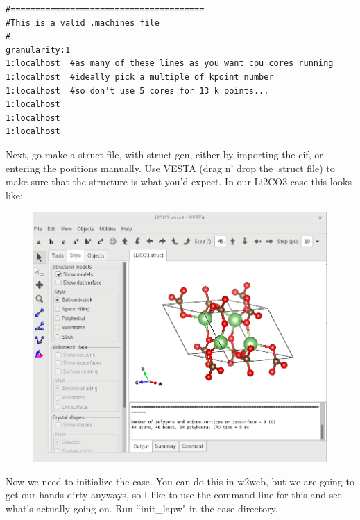 \documentclass[12pt]{article}
\begin{document}
\begin{lstlisting}
#=======================================
#This is a valid .machines file
#
granularity:1
1:localhost  #as many of these lines as you want cpu cores running
1:localhost  #ideally pick a multiple of kpoint number 
1:localhost  #so don't use 5 cores for 13 k points...
1:localhost
1:localhost
1:localhost

\end{lstlisting}

Next, go make a struct file, with struct gen, either by importing the cif, or entering the positions manually.  Use VESTA (drag n' drop the .struct file) to make sure that the structure is what you'd expect. 
In our Li2CO3 case this looks like: 

	\begin{figure}[H]
	\includegraphics[scale=0.4]{./images/Li2CO3_struct.png}
\end{figure}


Now we need to initialize the case.  You can do this in w2web, but we are going to get our hands dirty anyways, so I like to use the command line for this and see what's actually going on.  Run ``init\_lapw" in the case directory.
\end{document}
